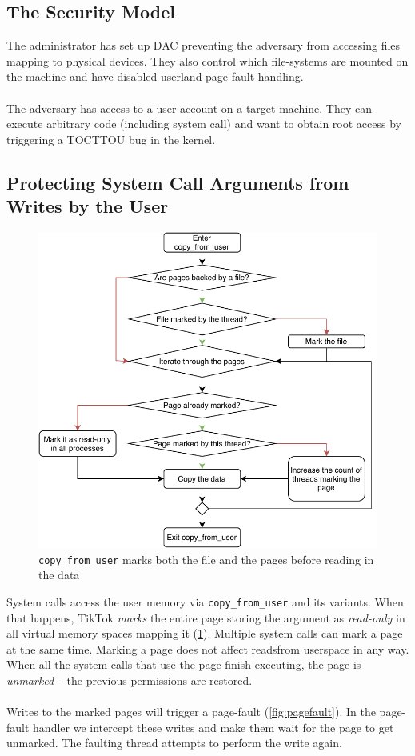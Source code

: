 \subsection{The Security Model}
\label{subsec:secmodel}
The administrator has set up DAC preventing the adversary from accessing files 
mapping to physical devices. They also control which file-systems are mounted on
the machine and have disabled userland page-fault handling.
\\
\\
The adversary has access to a user account on a target machine. They can execute
arbitrary code (including system call) and want to obtain root access by 
triggering a TOCTTOU bug in the kernel.

\subsection{Protecting System Call Arguments from Writes by the User}
\label{subsec:userland}
\begin{figure}[]
  \centering
  \includegraphics[width = .45 \textwidth]{img/copy_from_user.pdf}
  \caption{\texttt{copy\_from\_user} marks both the file and the pages before
  reading in the data}
  \label{fig:copyfromuser}
\end{figure}

System calls access the user memory via \texttt{copy\_from\_user} and its 
variants. When that happens, TikTok \emph{marks} the entire page storing the 
argument as \emph{read-only} in all virtual memory spaces mapping it 
(\cref{fig:copyfromuser}). Multiple system calls can mark a page at the same 
time. Marking a page does not affect readsfrom userspace in any way. When all 
the system calls that use the page finish executing, the page is \emph{unmarked}
 -- the previous permissions are restored.
\\
\\
Writes to the marked pages will trigger a page-fault (\cref{fig:pagefault}). In 
the page-fault handler we intercept these writes and make them wait for the page
to get unmarked. The faulting thread attempts to perform the write again.

